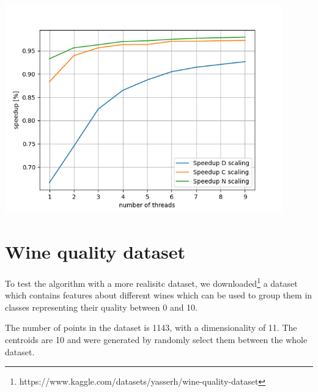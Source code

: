 \documentclass{report}
\begin{document}
\begin{minipage}[b]{0.48\textwidth}
  \begin{center} 
    \includegraphics[width = 0.9\textwidth]{imgs/rndspeedup.png}
    \label{fig:speedup}
  \end{center}

  \section*{Wine quality dataset}
  To test the algorithm with a more realisitc dataset, we downloaded\footnote{https://www.kaggle.com/datasets/yasserh/wine-quality-dataset} a dataset which contains features about different wines which can be used to group them in classes representing their quality between 0 and 10.
  
  The number of points in the dataset is 1143, with a dimensionality of 11. The centroids are 10 and were generated by randomly select them between the whole dataset.
\end{minipage}

\newpage
\end{document}
